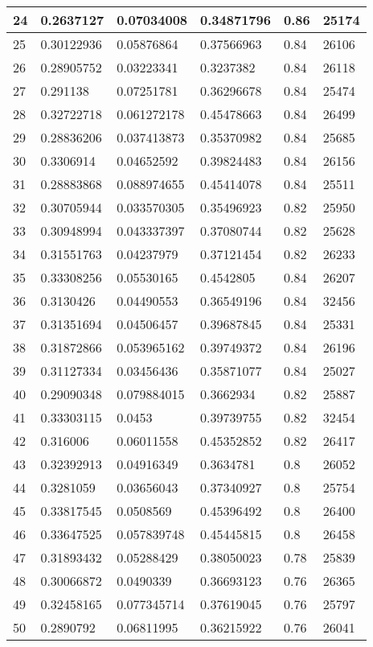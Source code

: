\begin{longtable}{|l|l|l|l|l|l|}
24 & 0.2637127 & 0.07034008 & 0.34871796 & 0.86 & 25174 \\ \hline 
25 & 0.30122936 & 0.05876864 & 0.37566963 & 0.84 & 26106 \\ \hline 
26 & 0.28905752 & 0.03223341 & 0.3237382 & 0.84 & 26118 \\ \hline 
27 & 0.291138 & 0.07251781 & 0.36296678 & 0.84 & 25474 \\ \hline 
28 & 0.32722718 & 0.061272178 & 0.45478663 & 0.84 & 26499 \\ \hline 
29 & 0.28836206 & 0.037413873 & 0.35370982 & 0.84 & 25685 \\ \hline 
30 & 0.3306914 & 0.04652592 & 0.39824483 & 0.84 & 26156 \\ \hline 
31 & 0.28883868 & 0.088974655 & 0.45414078 & 0.84 & 25511 \\ \hline 
32 & 0.30705944 & 0.033570305 & 0.35496923 & 0.82 & 25950 \\ \hline 
33 & 0.30948994 & 0.043337397 & 0.37080744 & 0.82 & 25628 \\ \hline 
34 & 0.31551763 & 0.04237979 & 0.37121454 & 0.82 & 26233 \\ \hline 
35 & 0.33308256 & 0.05530165 & 0.4542805 & 0.84 & 26207 \\ \hline 
36 & 0.3130426 & 0.04490553 & 0.36549196 & 0.84 & 32456 \\ \hline 
37 & 0.31351694 & 0.04506457 & 0.39687845 & 0.84 & 25331 \\ \hline 
38 & 0.31872866 & 0.053965162 & 0.39749372 & 0.84 & 26196 \\ \hline 
39 & 0.31127334 & 0.03456436 & 0.35871077 & 0.84 & 25027 \\ \hline 
40 & 0.29090348 & 0.079884015 & 0.3662934 & 0.82 & 25887 \\ \hline 
41 & 0.33303115 & 0.0453 & 0.39739755 & 0.82 & 32454 \\ \hline 
42 & 0.316006 & 0.06011558 & 0.45352852 & 0.82 & 26417 \\ \hline 
43 & 0.32392913 & 0.04916349 & 0.3634781 & 0.8 & 26052 \\ \hline 
44 & 0.3281059 & 0.03656043 & 0.37340927 & 0.8 & 25754 \\ \hline 
45 & 0.33817545 & 0.0508569 & 0.45396492 & 0.8 & 26400 \\ \hline 
46 & 0.33647525 & 0.057839748 & 0.45445815 & 0.8 & 26458 \\ \hline 
47 & 0.31893432 & 0.05288429 & 0.38050023 & 0.78 & 25839 \\ \hline 
48 & 0.30066872 & 0.0490339 & 0.36693123 & 0.76 & 26365 \\ \hline 
49 & 0.32458165 & 0.077345714 & 0.37619045 & 0.76 & 25797 \\ \hline 
50 & 0.2890792 & 0.06811995 & 0.36215922 & 0.76 & 26041 \\ \hline 
\end{longtable}
